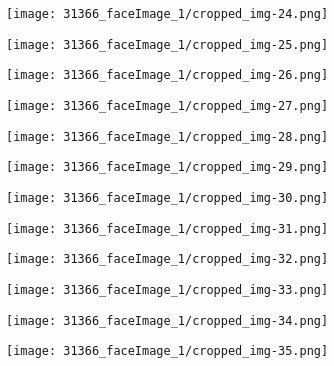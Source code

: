 \begin{figure}
{\begin{subfigure}{0.09\textwidth}
\end{subfigure}
\begin{subfigure}{0.09\textwidth}
  \centering
  \texttt{[image: 31366\_faceImage\_1/cropped\_img-24.png]}
\end{subfigure}
\begin{subfigure}{0.09\textwidth}
  \centering
  \texttt{[image: 31366\_faceImage\_1/cropped\_img-25.png]}
\end{subfigure}
\begin{subfigure}{0.09\textwidth}
  \centering
  \texttt{[image: 31366\_faceImage\_1/cropped\_img-26.png]}
\end{subfigure}
\begin{subfigure}{0.09\textwidth}
  \centering
  \texttt{[image: 31366\_faceImage\_1/cropped\_img-27.png]}
\end{subfigure}
\begin{subfigure}{0.09\textwidth}
  \centering
  \texttt{[image: 31366\_faceImage\_1/cropped\_img-28.png]}
\end{subfigure}
\begin{subfigure}{0.09\textwidth}
  \centering
  \texttt{[image: 31366\_faceImage\_1/cropped\_img-29.png]}
\end{subfigure}
}
\parbox{\textwidth}{
\begin{subfigure}{0.09\textwidth}
  \centering
  \texttt{[image: 31366\_faceImage\_1/cropped\_img-30.png]}
\end{subfigure}
\begin{subfigure}{0.09\textwidth}
  \centering
  \texttt{[image: 31366\_faceImage\_1/cropped\_img-31.png]}
\end{subfigure}
\begin{subfigure}{0.09\textwidth}
  \centering
  \texttt{[image: 31366\_faceImage\_1/cropped\_img-32.png]}
\end{subfigure}
\begin{subfigure}{0.09\textwidth}
  \centering
  \texttt{[image: 31366\_faceImage\_1/cropped\_img-33.png]}
\end{subfigure}
\begin{subfigure}{0.09\textwidth}
  \centering
  \texttt{[image: 31366\_faceImage\_1/cropped\_img-34.png]}
\end{subfigure}
\begin{subfigure}{0.09\textwidth}
  \centering
  \texttt{[image: 31366\_faceImage\_1/cropped\_img-35.png]}

\end{subfigure}}
\end{figure}

